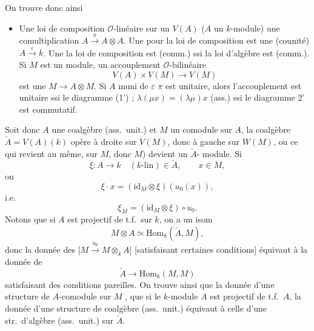 \documentclass[11pt,a4paper]{article}
\begin{document}
On trouve donc ainsi
\begin{itemize}
  \item[$\cdot$)] Une loi de composition $\mathcal{O}$-linéaire sur un $V(A)$ ($A$ un $k$-module)  une comultiplication $A \xrightarrow{\pi} A \otimes A$.
  Une  \ill{} pour la loi de composition est une (counité) $A \xrightarrow{\varepsilon} k$.
  Une \ill{} la loi de composition est \ill{} (comm.) ssi la loi d'algèbre est \ill{} (comm.).
  Si $M$ est un module, un accouplement $\mathcal{O}$-bilinéaire
  \[
    V(A) \times V(M) \longrightarrow V(M)
  \]
  est une \ill{}  $M \to A \otimes M$. Si $A$ muni de $\varepsilon$  $\pi$ est unitaire, alors  l'accouplement est unitaire ssi le diagramme (1')  ;  \ill{} \quad $\lambda(\mu x) = (\lambda\mu)x$ \quad (ass.) ssi le diagramme 2' est commutatif.
\end{itemize}

Soit donc $A$ une coalgèbre (ass.\ unit.) et $M$ un comodule  sur $A$, la coalgèbre $\check{A} = V(A)(k)$ opère à droite sur $V(M)$, donc à gauche sur $W(M)$, ou ce qui revient au même, sur $M$, donc  $M$) devient un $\check{A}$- module. Si
\[
  \xi : A \longrightarrow k \quad (k\text{-lin}) \in \check{A}, \qquad x \in M,
\]
on
\[
  \xi \cdot x = (\mathrm{id}_M \otimes \xi)(u_0(x)),
\]
i.e.
\[
  \xi_M = (\mathrm{id}_M \otimes \xi) \circ u_0 .
\]
Notons que si $A$ est \struck{\ill{}} projectif de t.f.\ sur $k$,  on a un isom 
\[
  M \otimes A \simeq \mathrm{Hom}_k(\check{A}, M) ,
\]
donc la donnée des $\bigl[M \xrightarrow{u_0} M \otimes_k A\bigr]$ [satisfaisant certaines conditions] \struck{\ill{}} équivaut à la donnée de
\[
  \check{A} \longrightarrow \mathrm{Hom}_k(M, M)
\]
satisfaisant des conditions pareilles. On trouve ainsi que la donnée d'une structure de $A$-comodule \struck{\ill{}} sur $M$ \ill{}, que si le $k$-module $A$ est projectif de t.f.\ $A$, la donnée d'une structure de coalgèbre (ass.\ unit.) équivaut à celle d'une str.\ d'algèbre (ass.\ unit.) sur $\check{A}$.
\end{document}
